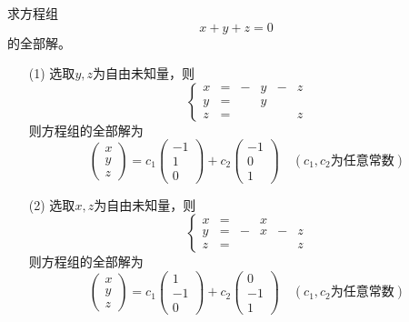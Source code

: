 \begin{frame}[allowframebreaks]
\begin{li}
  求方程组
  $$
  x+y+z=0
  $$
  的全部解。
\end{li}

\begin{jie}
\begin{itemize}
\item[(1)] 选取$y,z$为自由未知量，则
  $$
  \left\{
    \begin{array}{cccccc}
      x&=&-&y&-&z\\
      y&=&&y&&\\
      z&=&&&&z
    \end{array}
  \right.
  $$
  则方程组的全部解为
  $$
  \left(
    \begin{array}{r}
      x\\y\\z
    \end{array}
  \right) = c_1      \left(
    \begin{array}{r}
      -1\\1\\0
    \end{array}
  \right) + c_2      \left(
    \begin{array}{r}
      -1\\0\\1
    \end{array}
  \right) \quad (c_1,c_2\mbox{为任意常数})
  $$
\end{itemize}
\end{jie}
\end{frame}

\begin{frame}
\begin{jie}[续]
\begin{itemize}  
\item[(2)] 选取$x,z$为自由未知量，则
  $$
  \left\{
    \begin{array}{cccccc}
      x&=&&x&&\\
      y&=&-&x&-&z\\
      z&=&&&&z
    \end{array}
  \right.
  $$
  则方程组的全部解为
  $$
  \left(
    \begin{array}{r}
      x\\y\\z
    \end{array}
  \right) = c_1      \left(
    \begin{array}{r}
      1\\-1\\0
    \end{array}
  \right) + c_2      \left(
    \begin{array}{r}
      0\\-1\\1
    \end{array}
  \right) \quad (c_1,c_2\mbox{为任意常数})
  $$  
\end{itemize}
\end{jie}
\end{frame}

